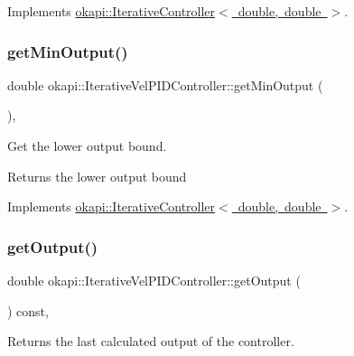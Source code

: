 Implements \mbox{\hyperlink{classokapi_1_1IterativeController_a09bdba3a6d7854d943ed5401210b0595}{okapi\+::\+Iterative\+Controller$<$ double, double $>$}}.

\mbox{\label{classokapi_1_1IterativeVelPIDController_a0401715743d991c5ca9f3afa51a5a069}} 
\subsubsection{\texorpdfstring{getMinOutput()}{getMinOutput()}}
{\footnotesize\ttfamily double okapi\+::\+Iterative\+Vel\+P\+I\+D\+Controller\+::get\+Min\+Output (\begin{DoxyParamCaption}{ }\end{DoxyParamCaption})\hspace{0.3cm}{\ttfamily [override]}, {\ttfamily [virtual]}}

Get the lower output bound.

\begin{DoxyReturn}{Returns}
the lower output bound 
\end{DoxyReturn}


Implements \mbox{\hyperlink{classokapi_1_1IterativeController_a4d271df97caeedbcc807b714a48eaa30}{okapi\+::\+Iterative\+Controller$<$ double, double $>$}}.

\mbox{\label{classokapi_1_1IterativeVelPIDController_ab3f4050524cb54b4e3df951a8d84ac57}} 
\subsubsection{\texorpdfstring{getOutput()}{getOutput()}}
{\footnotesize\ttfamily double okapi\+::\+Iterative\+Vel\+P\+I\+D\+Controller\+::get\+Output (\begin{DoxyParamCaption}{ }\end{DoxyParamCaption}) const\hspace{0.3cm}{\ttfamily [override]}, {\ttfamily [virtual]}}

Returns the last calculated output of the controller. 

